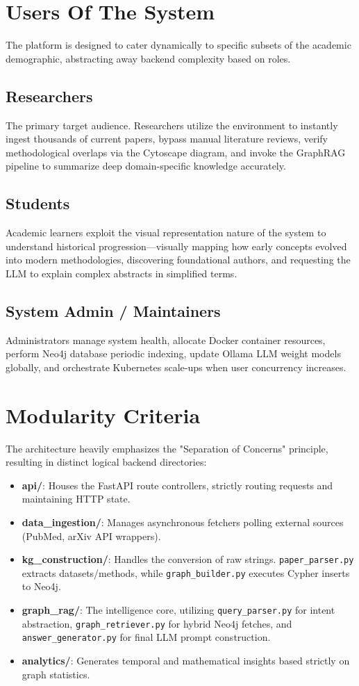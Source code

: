\documentclass[12pt,a4paper]{report}
\begin{document}
\section{Users Of The System}
The platform is designed to cater dynamically to specific subsets of the academic demographic, abstracting away backend complexity based on roles.

\subsection{Researchers}
The primary target audience. Researchers utilize the environment to instantly ingest thousands of current papers, bypass manual literature reviews, verify methodological overlaps via the Cytoscape diagram, and invoke the GraphRAG pipeline to summarize deep domain-specific knowledge accurately.

\subsection{Students}
Academic learners exploit the visual representation nature of the system to understand historical progression—visually mapping how early concepts evolved into modern methodologies, discovering foundational authors, and requesting the LLM to explain complex abstracts in simplified terms.

\subsection{System Admin / Maintainers}
Administrators manage system health, allocate Docker container resources, perform Neo4j database periodic indexing, update Ollama LLM weight models globally, and orchestrate Kubernetes scale-ups when user concurrency increases.

\section{Modularity Criteria}
The architecture heavily emphasizes the "Separation of Concerns" principle, resulting in distinct logical backend directories:
\begin{itemize}
    \item \textbf{api/}: Houses the FastAPI route controllers, strictly routing requests and maintaining HTTP state.
    \item \textbf{data\_ingestion/}: Manages asynchronous fetchers polling external sources (PubMed, arXiv API wrappers).
    \item \textbf{kg\_construction/}: Handles the conversion of raw strings. \texttt{paper\_parser.py} extracts datasets/methods, while \texttt{graph\_builder.py} executes Cypher inserts to Neo4j.
    \item \textbf{graph\_rag/}: The intelligence core, utilizing \texttt{query\_parser.py} for intent abstraction, \texttt{graph\_retriever.py} for hybrid Neo4j fetches, and \texttt{answer\_generator.py} for final LLM prompt construction.
    \item \textbf{analytics/}: Generates temporal and mathematical insights based strictly on graph statistics.
\end{itemize}
\end{document}
